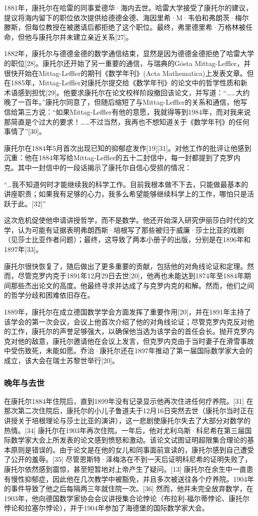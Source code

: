 1881年，康托尔在哈雷的同事爱德华·海内去世。哈雷大学接受了康托尔的建议，提议将海内留下的职位依次提供给德德金德、海因里希·M·韦伯和弗朗茨·梅尔滕斯，但每位教授在被邀请后都拒绝了这个职位。最终，弗里德里希·万格林被任命，但他与康托尔并未建立亲近关系[27]。

1882年，康托尔与德德金德的数学通信结束，显然是因为德德金德拒绝了哈雷大学的职位[28]。康托尔还开始了另一重要的通信，与瑞典的Gösta Mittag-Leffler，并很快开始在Mittag-Leffler的期刊《数学年刊》(Acta Mathematica)上发表文章。但在1885年，Mittag-Leffler对康托尔提交给《数学年刊》的论文中的哲学性质和新术语感到担忧[29]。他要求康托尔在论文校样阶段撤回该论文，并写道：“……大约晚了一百年。”康托尔同意了，但随后缩短了与Mittag-Leffler的关系和通信，他写信给第三方说：“如果Mittag-Leffler有他的意愿，我就得等到1984年，而对我来说那简直是个过大的要求！……不过当然，我再也不想知道关于《数学年刊》的任何事情了”[30]。

康托尔在1884年5月首次出现已知的抑郁症发作[19][31]。对他工作的批评让他感到沉重：他在1884年写给Mittag-Leffler的五十二封信中，每一封都提到了克罗内克。其中一封信中的一段话揭示了康托尔自信心受损的情况：

“…我不知道何时才能继续我的科学工作。目前我根本做不下去，只能做最基本的讲座职责；如果我有足够的心力，我多么希望能够继续科学上的工作，哪怕只是活跃于此。[32]”

这次危机促使他申请讲授哲学，而不是数学。他还开始深入研究伊丽莎白时代的文学，认为可能有证据表明弗朗西斯·培根写了那些被归于威廉·莎士比亚的戏剧（见莎士比亚作者问题）；最终，这导致了两本小册子的出版，分别是在1896年和1897年[33]。

康托尔很快恢复了，随后做出了更多重要的贡献，包括他的对角线论证和定理。然而，尽管克罗内克于1891年12月29日去世[20]，他再也未能达到1874年至1884年期间那些杰出论文的高度。他最终寻求并达成了与克罗内克的和解。然而，他们之间的哲学分歧和困难依旧存在。

1889年，康托尔在成立德国数学学会方面发挥了重要作用[20]，并在1891年主持了该学会的第一次会议，会议上他首次介绍了他的对角线论证；尽管克罗内克反对他的工作，康托尔的声誉足够强大，以确保他当选为该学会的首任会长。抛开克罗内克对他的敌意，康托尔邀请他在会议上发言，但克罗内克由于当时妻子在滑雪事故中受伤致死，未能如愿。乔治·康托尔还在1897年推动了第一届国际数学家大会的成立，该大会在瑞士苏黎世举行[20]。
\subsubsection{晚年与去世}  
在康托尔1884年住院后，直到1899年没有记录显示他再次住进任何疗养院。[31] 在那次第二次住院后，康托尔的小儿子鲁道夫于12月16日突然去世（康托尔当时正在讲授关于培根理论与莎士比亚的演讲），这一悲剧使康托尔失去了大部分对数学的热情。[34] 康托尔在1903年再次住院。一年后，他对尤利乌斯·科尼希在第三届国际数学家大会上所发表的论文感到愤怒和激动。该论文试图证明超限集合理论的基本原则是错误的。由于论文是在他的女儿和同事面前宣读的，康托尔感到自己遭受了公开的羞辱。[35] 尽管恩斯特·泽梅洛在不到一天后证明科尼希的证明失败了，康托尔依然感到震惊，甚至短暂地对上帝产生了疑问。[13] 康托尔在余生中一直患有慢性抑郁症，因此他在几次教学中被豁免，并且多次被送往各个疗养院。1904年的事件导致了他之后每隔两三年就住院一次。[36] 然而，他并未完全放弃数学，在1903年，他向德国数学家协会会议讲授集合论悖论（布拉利-福尔蒂悖论、康托尔悖论和拉塞尔悖论），并于1904年参加了海德堡的国际数学家大会。

